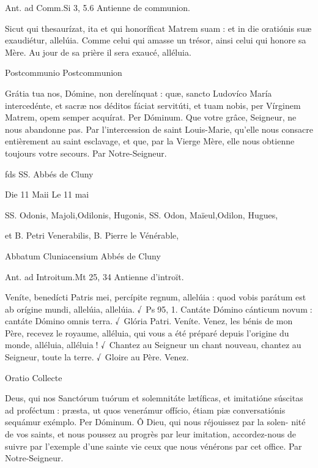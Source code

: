\begin{paracol}{2}
Ant. ad Comm.\hfill Si 3, 5.6
\switchcolumn
Antienne de communion.
\switchcolumn*

Sicut qui thesaurízat, ita et qui honoríficat Matrem suam : et in die oratiónis suæ exaudiétur, allelúia.
\switchcolumn
Comme celui qui amasse un trésor, ainsi celui qui honore sa Mère. Au jour de sa prière il sera exaucé, alléluia.
\switchcolumn*

Postcommunio
\switchcolumn
Postcommunion
\switchcolumn*

Grátia tua nos, Dómine, non  derelínquat : quæ, sancto Ludovíco María intercedénte, et sacræ nos déditos fáciat servitúti, et tuam nobis, per Vírginem Matrem, opem semper acquírat. Per Dóminum.
\switchcolumn
Que votre grâce, Seigneur, ne nous  abandonne pas. Par l’intercession de saint Louis-Marie, qu’elle nous consacre entièrement au saint esclavage, et que, par la Vierge Mère, elle nous obtienne toujours votre secours. Par Notre-Seigneur.
\switchcolumn*

fds
\switchcolumn
SS. Abbés de Cluny
\switchcolumn*

Die 11 Maii
\switchcolumn
Le 11 mai
\switchcolumn*

SS. Odonis, Majoli,Odilonis, Hugonis,
\switchcolumn
SS. Odon, Maïeul,Odilon, Hugues,
\switchcolumn*

et B. Petri Venerabilis,
\switchcolumn
B. Pierre le Vénérable,
\switchcolumn*

Abbatum Cluniacensium
\switchcolumn
Abbés de Cluny
\switchcolumn*


\switchcolumn

\switchcolumn*

Ant. ad Introitum.\hfill Mt 25, 34
\switchcolumn
Antienne d’introït.
\switchcolumn*

Veníte, benedícti Patris mei, percípite regnum, allelúia : quod vobis parátum est ab orígine mundi, allelúia, allelúia. √~Ps 95, 1. Cantáte Dómino cánticum novum : cantáte Dómino omnis terra. √~Glória Patri. Veníte.
\switchcolumn
Venez, les bénis de mon Père, recevez le royaume, alléluia, qui vous a été préparé depuis l’origine du monde, alléluia, alléluia ! √~Chantez au Seigneur un chant nouveau, chantez au Seigneur, toute la terre. √~Gloire au Père. Venez.
\switchcolumn*

Oratio
\switchcolumn
Collecte
\switchcolumn*

Deus, qui nos Sanctórum tuórum et  solemnitáte lætíficas, et imitatióne súscitas ad proféctum : præsta, ut quos venerámur offício, étiam piæ conversatiónis sequámur exémplo. Per Dóminum.
\switchcolumn
Ô Dieu, qui nous réjouissez par la solen- nité de vos saints, et nous poussez au progrès par leur imitation, accordez-nous de suivre par l’exemple d’une sainte vie ceux que nous vénérons par cet office. Par Notre-Seigneur.
\switchcolumn*


\end{paracol}
